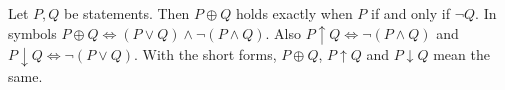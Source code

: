 Let $P, Q$ be statements.
Then $P \oplus Q$ holds exactly when $P$ if and only if $\neg Q$.
In symbols $P \oplus Q \iff (P \lor Q) \land \neg (P \land Q)$.
Also $P \uparrow Q \iff \neg (P \land Q)$ and $P \downarrow Q \iff \neg (P \lor Q)$.
With the short forms, $P \oplus Q$, $P \uparrow Q$ and $P \downarrow Q$ mean the same.